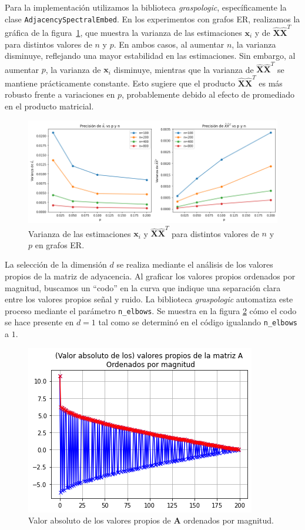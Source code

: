 \documentclass{article}
\begin{document}
Para la implementación utilizamos la biblioteca \textit{graspologic}, específicamente la clase \newline
\verb|AdjacencySpectralEmbed|. En los experimentos con grafos ER, realizamos la gráfica de la figura~\ref{fig:precision}, que muestra la varianza de las estimaciones $\mathbf{x}_i$ y de $\hat{\mathbf{X}}\hat{\mathbf{X}}^T$ para distintos valores de $n$ y $p$. En ambos casos, al aumentar $n$, la varianza disminuye, reflejando una mayor estabilidad en las estimaciones. Sin embargo, al aumentar $p$, la varianza de $\mathbf{x}_i$ disminuye, mientras que la varianza de $\hat{\mathbf{X}}\hat{\mathbf{X}}^T$ se mantiene prácticamente constante. Esto sugiere que el producto $\hat{\mathbf{X}}\hat{\mathbf{X}}^T$ es más robusto frente a variaciones en $p$, probablemente debido al efecto de promediado en el producto matricial.

\begin{figure}[htb]
    \centering
    \includegraphics[width=0.8\linewidth]{images/precision.png}
    \caption{Varianza de las estimaciones $\mathbf{x}_i$ y $\hat{\mathbf{X}}\hat{\mathbf{X}}^T$ para distintos valores de $n$ y $p$ en grafos ER.}
    \label{fig:precision}
\end{figure}


La selección de la dimensión $d$ se realiza mediante el análisis de los valores propios de la matriz de adyacencia. Al graficar los valores propios ordenados por magnitud, buscamos un ``codo'' en la curva que indique una separación clara entre los valores propios señal y ruido. La biblioteca \textit{graspologic} automatiza este proceso mediante el parámetro \verb|n_elbows|. Se muestra en la figura \ref{fig:valores propios} cómo el codo se hace presente en $d=1$ tal como se determinó en el código igualando \verb|n_elbows| a $1$. 

\begin{figure}[htb]
    \centering
    \includegraphics[width=0.5\linewidth]{images/valores_propios.png}
    \caption{Valor absoluto de los valores propios de $\mathbf{A}$ ordenados por magnitud.}
    \label{fig:valores propios}
\end{figure}
\end{document}
